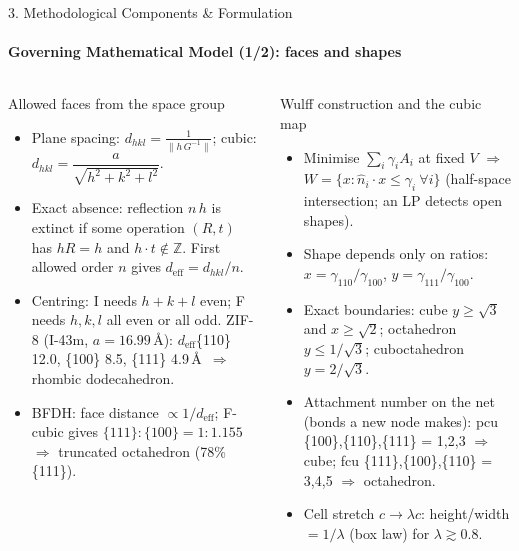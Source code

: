 \documentclass[aspectratio=169, 11pt]{beamer}
\begin{document}
\begin{frame}[shrink=10]{3. Methodological Components \& Formulation}
    \framesubtitle{Governing Mathematical Model (1/2): faces and shapes}
    \begin{columns}[T]
        \begin{block}{Allowed faces from the space group}
            \scriptsize
            \begin{itemize}
                \item Plane spacing: $\displaystyle d_{hkl} = \frac{1}{\lVert h\,G^{-1}\rVert}$; cubic: $d_{hkl} = \dfrac{a}{\sqrt{h^2+k^2+l^2}}$.
                \item Exact absence: reflection $n\,h$ is extinct if some operation $(R,t)$ has $hR = h$ and $h\cdot t \notin \mathbb{Z}$. First allowed order $n$ gives $d_\text{eff} = d_{hkl}/n$.
                \item Centring: I needs $h{+}k{+}l$ even; F needs $h,k,l$ all even or all odd. ZIF-8 (I-43m, $a = 16.99$\,\AA): $d_\text{eff}$\{110\} 12.0, \{100\} 8.5, \{111\} 4.9\,\AA\ $\Rightarrow$ rhombic dodecahedron.
                \item BFDH: face distance $\propto 1/d_\text{eff}$; F-cubic gives $\{111\}:\{100\} = 1 : 1.155$ $\Rightarrow$ truncated octahedron (78\% \{111\}).
            \end{itemize}
        \end{block}
        \begin{block}{Wulff construction and the cubic map}
            \scriptsize
            \begin{itemize}
                \item Minimise $\sum_i \gamma_i A_i$ at fixed $V$ $\Rightarrow$ $W = \{x : \hat n_i\cdot x \le \gamma_i\ \forall i\}$ (half-space intersection; an LP detects open shapes).
                \item Shape depends only on ratios: $x = \gamma_{110}/\gamma_{100}$, $y = \gamma_{111}/\gamma_{100}$.
                \item Exact boundaries: cube $y \ge \sqrt3$ and $x \ge \sqrt2$; octahedron $y \le 1/\sqrt3$; cuboctahedron $y = 2/\sqrt3$.
                \item Attachment number on the net (bonds a new node makes): pcu \{100\},\{110\},\{111\} = 1,2,3 $\Rightarrow$ cube; fcu \{111\},\{100\},\{110\} = 3,4,5 $\Rightarrow$ octahedron.
                \item Cell stretch $c \rightarrow \lambda c$: height/width $= 1/\lambda$ (box law) for $\lambda \gtrsim 0.8$.
            \end{itemize}
        \end{block}
    \end{columns}
\end{frame}
\end{document}
